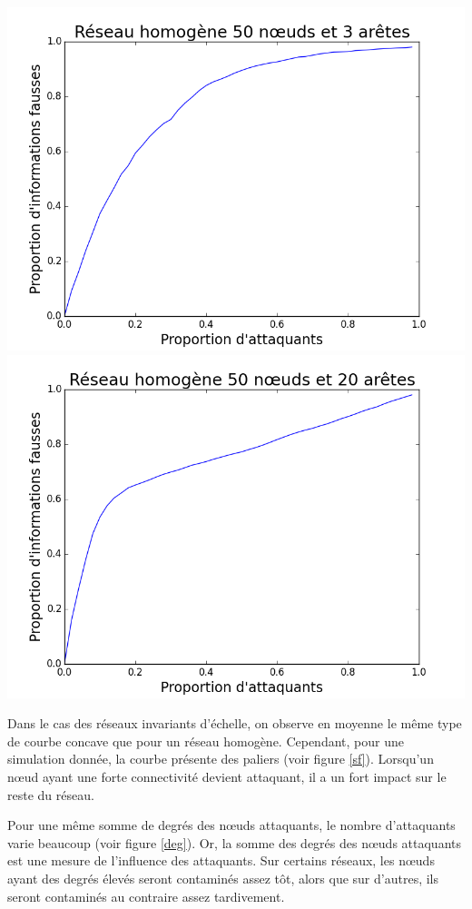 \documentclass[12pt,a4paper]{article}
\begin{document}
\begin{center}
\includegraphics[width=0.49\linewidth]{../resultats/atkaleat/atkaleat-50-3-2-i100.png}
\includegraphics[width=0.49\linewidth]{../resultats/atkaleat/atkaleat-50-20-2-i100.png}
 \label{aretes}
\end{center}

Dans le cas des réseaux invariants d'échelle, on observe en moyenne le même type de courbe concave que pour un réseau homogène.
Cependant, pour une simulation donnée, la courbe présente des paliers (voir figure \ref{sf}).
Lorsqu'un nœud ayant une forte connectivité devient attaquant, il a un fort impact sur le reste du réseau.

Pour une même somme de degrés des nœuds attaquants, le nombre d'attaquants varie beaucoup (voir figure \ref{deg}).
Or, la somme des degrés des nœuds attaquants est une mesure de l'influence des attaquants.
Sur certains réseaux, les nœuds ayant des degrés élevés seront contaminés assez tôt, alors que sur d'autres, ils seront contaminés au contraire assez tardivement.
\end{document}
